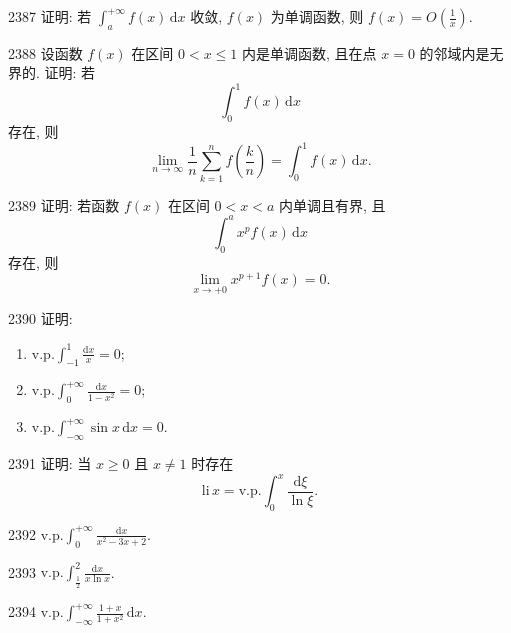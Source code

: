 \begin{prob}[M]{2387}
证明: 若 $\displaystyle\int_a^{+\infty} f(x)\,\mathrm{d}x$ 收敛, $f(x)$ 为单调函数, 则 $f(x) = O\left(\frac{1}{x}\right)$.
\end{prob}

\begin{prob}[M]{2388}
设函数 $f(x)$ 在区间 $0 < x \leqslant 1$ 内是单调函数, 且在点 $x = 0$ 的邻域内是无界的. 证明: 若
\[
\int_0^1 f(x)\,\mathrm{d}x
\]
存在, 则
\[
\lim_{n \to \infty} \frac{1}{n} \sum_{k=1}^n f\left(\frac{k}{n}\right) = \int_0^1 f(x)\,\mathrm{d}x.
\]
\end{prob}

\begin{prob}[M]{2389}
证明: 若函数 $f(x)$ 在区间 $0 < x < a$ 内单调且有界, 且
\[
\int_0^a x^p f(x)\,\mathrm{d}x
\]
存在, 则
\[
\lim_{x \to +0} x^{p+1} f(x) = 0.
\]
\end{prob}

\begin{prob}[L]{2390}
证明:
\begin{enumerate}[label=(\alph*), itemsep=2pt, topsep=3pt]
\item $\mathrm{v.p.} \displaystyle\int_{-1}^1 \frac{\mathrm{d}x}{x} = 0$;
\item $\mathrm{v.p.} \displaystyle\int_0^{+\infty} \frac{\mathrm{d}x}{1 - x^2} = 0$;
\item $\mathrm{v.p.} \displaystyle\int_{-\infty}^{+\infty} \sin x\,\mathrm{d}x = 0$.
\end{enumerate}
\end{prob}

\begin{prob}[M]{2391}
证明: 当 $x \geqslant 0$ 且 $x \neq 1$ 时存在
\[
\mathrm{li}\,x = \mathrm{v.p.} \int_0^x \frac{\mathrm{d}\xi}{\ln \xi}.
\]
\end{prob}


\begin{prob}[S]{2392}
$\mathrm{v.p.} \displaystyle\int_0^{+\infty} \frac{\mathrm{d}x}{x^2 - 3x + 2}$.
\end{prob}

\begin{prob}[S]{2393}
$\mathrm{v.p.} \displaystyle\int_{\frac{1}{2}}^2 \frac{\mathrm{d}x}{x \ln x}$.
\end{prob}

\begin{prob}[S]{2394}
$\mathrm{v.p.} \displaystyle\int_{-\infty}^{+\infty} \frac{1 + x}{1 + x^2}\,\mathrm{d}x$.
\end{prob}

